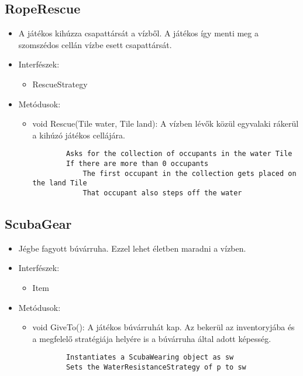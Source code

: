 \subsection{RopeRescue}
\begin{itemize}
	\item A játékos kihúzza csapattársát a vízből. A játékos így menti meg a szomszédos cellán vízbe esett csapattársát.
	\item Interfészek:
	\begin{itemize}
		\item RescueStrategy
	\end{itemize}
	\item Metódusok:
	\begin{itemize}
		\item void Rescue(Tile water, Tile land): A vízben lévők közül egyvalaki rákerül a kihúzó játékos cellájára.
		\begin{lstlisting}
		Asks for the collection of occupants in the water Tile
		If there are more than 0 occupants
			The first occupant in the collection gets placed on the land Tile
			That occupant also steps off the water
		\end{lstlisting}
	\end{itemize}
\end{itemize}

\subsection{ScubaGear}
\begin{itemize}
	\item Jégbe fagyott búvárruha. Ezzel lehet életben maradni a vízben.
	\item Interfészek:
	\begin{itemize}
		\item Item
	\end{itemize}
	\item Metódusok:
	\begin{itemize}
		\item void GiveTo(): A játékos búvárruhát kap. Az bekerül az inventoryjába és a megfelelő stratégiája helyére is a búvárruha által adott képesség.
		\begin{lstlisting}
		Instantiates a ScubaWearing object as sw
		Sets the WaterResistanceStrategy of p to sw
		\end{lstlisting}
	\end{itemize}
\end{itemize}

